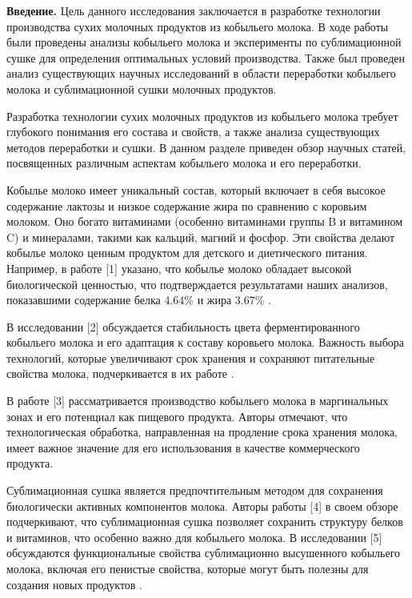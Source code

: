 \begin{multicols}{2}
{\bfseries Введение.} Цель данного исследования заключается в разработке
технологии производства сухих молочных продуктов из кобыльего молока. В
ходе работы были проведены анализы кобыльего молока и эксперименты по
сублимационной сушке для определения оптимальных условий производства.
Также был проведен анализ существующих научных исследований в области
переработки кобыльего молока и сублимационной сушки молочных продуктов.

Разработка технологии сухих молочных продуктов из кобыльего молока
требует глубокого понимания его состава и свойств, а также анализа
существующих методов переработки и сушки. В данном разделе приведен
обзор научных статей, посвященных различным аспектам кобыльего молока и
его переработки.

Кобылье молоко имеет уникальный состав, который включает в себя высокое
содержание лактозы и низкое содержание жира по сравнению с коровьим
молоком. Оно богато витаминами (особенно витаминами группы B и витамином
C) и минералами, такими как кальций, магний и фосфор. Эти свойства
делают кобылье молоко ценным продуктом для детского и диетического
питания. Например, в работе {[}1{]} указано, что кобылье молоко обладает
высокой биологической ценностью, что подтверждается результатами наших
анализов, показавшими содержание белка 4.64\% и жира 3.67\% .

В исследовании {[}2{]} обсуждается стабильность цвета ферментированного
кобыльего молока и его адаптация к составу коровьего молока. Важность
выбора технологий, которые увеличивают срок хранения и сохраняют
питательные свойства молока, подчеркивается в их работе .

В работе {[}3{]} рассматривается производство кобыльего молока в
маргинальных зонах и его потенциал как пищевого продукта. Авторы
отмечают, что технологическая обработка, направленная на продление срока
хранения молока, имеет важное значение для его использования в качестве
коммерческого продукта.

Сублимационная сушка является предпочтительным методом для сохранения
биологически активных компонентов молока. Авторы работы {[}4{]} в своем
обзоре подчеркивают, что сублимационная сушка позволяет сохранить
структуру белков и витаминов, что особенно важно для кобыльего молока. В
исследовании {[}5{]} обсуждаются функциональные свойства сублимационно
высушенного кобыльего молока, включая его пенистые свойства, которые
могут быть полезны для создания новых продуктов .


\end{multicols}
